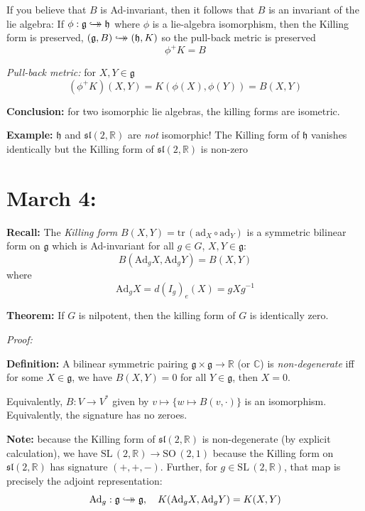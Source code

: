 \documentclass[12pt]{article}
\newcommand{\R}{\mathbb{R}}
\newcommand{\C}{\mathbb{C}}
\newcommand{\SL}{\text{SL}\,}
\newcommand{\SO}{\text{SO}\,}
\newcommand{\tr}{\text{tr}\,}
\newcommand{\biject}{\hookrightarrow \hspace{-8pt} \rightarrow}
\newcommand{\g}{\mathfrak{g}}
\newcommand{\h}{\mathfrak{h}}
\newcommand{\slf}{\mathfrak{sl}}
\newcommand{\Ad}{\text{Ad}}
\newenvironment*{tbox}[2][gray]{
    \begin{tcolorbox}[
        parbox=false,
        colback=#1!5!white,
        colframe=#1!75!black,
        breakable,
        title={#2}
    ]}
    {\end{tcolorbox}}
\begin{document}
    If you believe that $B$ is Ad-invariant, then it follows that $B$ is an invariant of the lie algebra: If $\phi: \g \biject \h$ where $\phi$ is a lie-algebra isomorphism, then the Killing form is preserved, $(\g, B) \biject (\h, K)$ so the pull-back metric is preserved 
    \[\phi^+ K =B\] 

    \emph{Pull-back metric:} for $X, Y \in \g$
    \[(\phi^+ K) (X, Y) = K(\phi(X), \phi(Y)) = B(X, Y)\]

    \textbf{Conclusion:} for two isomorphic lie algebras, the killing forms are isometric.

    \textbf{Example:} $\h$ and $\slf(2,\R)$ are \emph{not} isomorphic! The Killing form of $\h$ vanishes identically but the Killing form of $\slf(2, \R)$ is non-zero

\section{March 4:}
    \textbf{Recall:} The \emph{Killing form} $B(X, Y) = \tr(\text{ad}_X \circ \text{ad}_Y)$ is a symmetric bilinear form on $\g$ which is Ad-invariant for all $g \in G$, $X, Y \in \g$: 
    \[B(\Ad_g X, \Ad_g Y) = B(X, Y)\]
    where 
    \[\Ad_g X = d(I_g)_e(X) = gXg^{-1}\]

    \textbf{Theorem:} If $G$ is nilpotent, then the killing form of $G$ is identically zero. 

    \begin{tbox}{\textbf{Theorem (Cartan's Criterion for Semi-simplicity):} A lie-algebra $\g$ is semi-simple (it has no non-zero solvable ideals) iff the Killing form is non-degenerate.}
        \emph{Proof:} 
    \end{tbox}

    \textbf{Definition:} A bilinear symmetric pairing $\g \times \g \to \R$ (or $\C$) is \emph{non-degenerate} iff for some $X \in \g$, we have $B(X, Y) = 0$ for all $Y \in \g$, then $X = 0$. 
    
    Equivalently, $B: V\to V^*$ given by $v\mapsto \{w \mapsto B(v, \cdot)\}$ is an isomorphism. Equivalently, the signature has no zeroes. 

    \textbf{Note:} because the Killing form of $\slf(2, \R)$ is non-degenerate (by explicit calculation), we have $\SL(2, \R) \to \SO(2, 1)$ because the Killing form on $\slf(2, \R)$ has signature $(+, +, -)$. Further, for $g \in \SL(2, \R)$, that map is precisely the adjoint representation:
    \[\Ad_g: \g \biject \g, \quad K(\Ad_g X, \Ad_g Y) = K(X, Y)\] 
\end{document}
